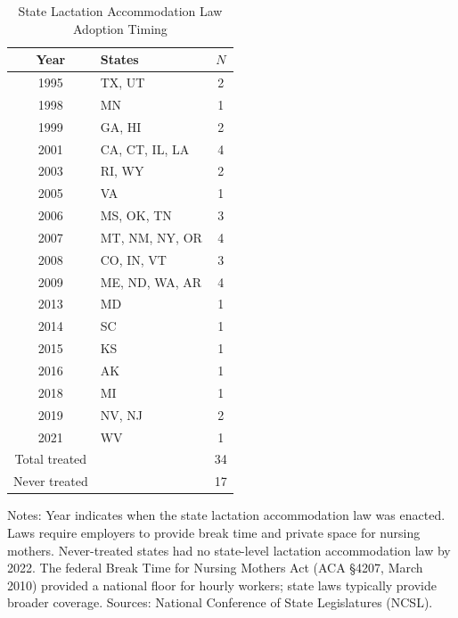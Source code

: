 \begin{table}[H]
\centering
\caption{State Lactation Accommodation Law Adoption Timing}
\begin{threeparttable}
\begin{tabular}{clc}
\toprule
Year & States & $N$ \\
\midrule
1995 & TX, UT & 2 \\
1998 & MN & 1 \\
1999 & GA, HI & 2 \\
2001 & CA, CT, IL, LA & 4 \\
2003 & RI, WY & 2 \\
2005 & VA & 1 \\
2006 & MS, OK, TN & 3 \\
2007 & MT, NM, NY, OR & 4 \\
2008 & CO, IN, VT & 3 \\
2009 & ME, ND, WA, AR & 4 \\
2013 & MD & 1 \\
2014 & SC & 1 \\
2015 & KS & 1 \\
2016 & AK & 1 \\
2018 & MI & 1 \\
2019 & NV, NJ & 2 \\
2021 & WV & 1 \\
\midrule
Total treated & & 34 \\
Never treated & & 17 \\
\bottomrule
\end{tabular}
\begin{tablenotes}[flushleft]
\small
\item Notes: Year indicates when the state lactation accommodation law was enacted.
Laws require employers to provide break time and private space for nursing mothers.
Never-treated states had no state-level lactation accommodation law by 2022.
The federal Break Time for Nursing Mothers Act (ACA \S4207, March 2010) provided a
national floor for hourly workers; state laws typically provide broader coverage.
Sources: National Conference of State Legislatures (NCSL).
\end{tablenotes}
\end{threeparttable}
\label{tab:timing}
\end{table}

